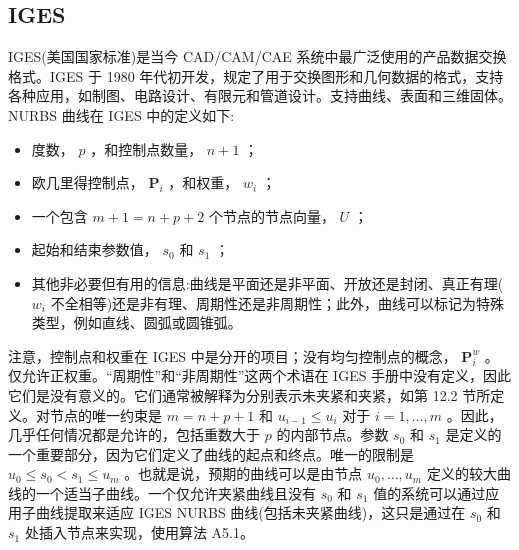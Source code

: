 \documentclass[../main.tex]{subfiles}
\begin{document}
\subsection{IGES}

IGES(美国国家标准)是当今 CAD/CAM/CAE 系统中最广泛使用的产品数据交换格式。IGES 于 1980 年代初开发，规定了用于交换图形和几何数据的格式，支持各种应用，如制图、电路设计、有限元和管道设计。支持曲线、表面和三维固体。NURBS 曲线在 IGES 中的定义如下:





\begin{itemize}
\item 度数， \(p\) ，和控制点数量， \(n + 1\) ；
\end{itemize}

\begin{itemize}
\item 欧几里得控制点， \({\mathbf{P}}_{i}\) ，和权重， \({w}_{i}\) ；
\end{itemize}

\begin{itemize}
\item 一个包含 \(m + 1 = n + p + 2\) 个节点的节点向量， \(U\) ；
\end{itemize}

\begin{itemize}
\item 起始和结束参数值， \({s}_{0}\) 和 \({s}_{1}\) ；
\end{itemize}

\begin{itemize}
\item 其他非必要但有用的信息:曲线是平面还是非平面、开放还是封闭、真正有理( \({w}_{i}\) 不全相等)还是非有理、周期性还是非周期性；此外，曲线可以标记为特殊类型，例如直线、圆弧或圆锥弧。
\end{itemize}

注意，控制点和权重在 IGES 中是分开的项目；没有均匀控制点的概念， \({\mathbf{P}}_{i}^{w}\) 。仅允许正权重。“周期性”和“非周期性”这两个术语在 IGES 手册中没有定义，因此它们是没有意义的。它们通常被解释为分别表示未夹紧和夹紧，如第 12.2 节所定义。对节点的唯一约束是 \(m = n + p + 1\) 和 \({u}_{i - 1} \leq  {u}_{i}\) 对于 \(i = 1,\ldots ,m\) 。因此，几乎任何情况都是允许的，包括重数大于 \(p\) 的内部节点。参数 \({s}_{0}\) 和 \({s}_{1}\) 是定义的一个重要部分，因为它们定义了曲线的起点和终点。唯一的限制是 \({u}_{0} \leq  {s}_{0} < {s}_{1} \leq  {u}_{m}\) 。也就是说，预期的曲线可以是由节点 \({u}_{0},\ldots ,{u}_{m}\) 定义的较大曲线的一个适当子曲线。一个仅允许夹紧曲线且没有 \({s}_{0}\) 和 \({s}_{1}\) 值的系统可以通过应用子曲线提取来适应 IGES NURBS 曲线(包括未夹紧曲线)，这只是通过在 \({s}_{0}\) 和 \({s}_{1}\) 处插入节点来实现，使用算法 A5.1。
\end{document}
